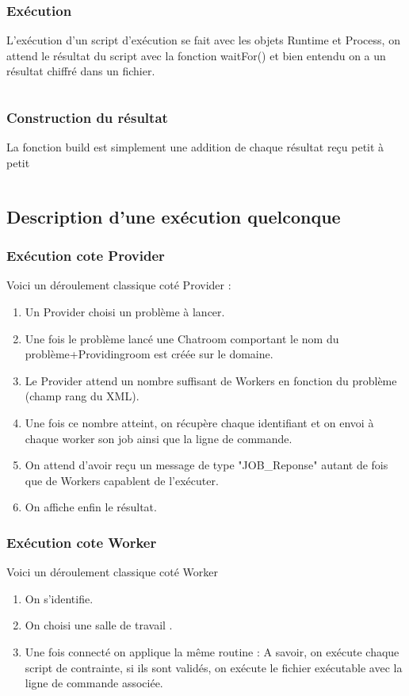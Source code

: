 \documentclass[11pt]{article}
\begin{document}
\subsubsection{Exécution} 
L\textquoteright exécution d'un script d'exécution se fait avec les objets Runtime et Process, on attend le résultat du script avec la fonction waitFor() et bien entendu on a un résultat chiffré dans un fichier. 
\inputminted[tabsize=2,frame=lines,linenos]{Perl}{Fichier_import/calcul.pl}
\newpage
\subsubsection{Construction du résultat} 
La fonction build est simplement une addition de chaque résultat reçu petit à petit 
\inputminted[tabsize=2,frame=lines,linenos]{java}{Fichier_import/build.java}
\newpage
\subsection{Description d'une exécution quelconque} 
\subsubsection{Exécution cote Provider}
Voici un déroulement classique coté Provider :
\begin{enumerate}
\item Un Provider choisi un problème à lancer.
\item Une fois le problème lancé une Chatroom comportant le nom du problème+Providingroom est créée sur le domaine.
\item Le Provider attend un nombre suffisant de Workers en fonction du problème (champ rang du XML).
\item Une fois ce nombre atteint, on récupère chaque identifiant et on envoi à chaque worker son job ainsi que la ligne de commande.
\item On attend d'avoir reçu un message de type "JOB\_Reponse" autant de fois que de Workers capablent de l'exécuter. 
\item On affiche enfin le résultat. 
\end{enumerate}

\subsubsection{Exécution cote Worker}
Voici un déroulement classique coté Worker
\begin{enumerate}
\item On s'identifie.
\item On choisi une salle de travail .
\item Une fois connecté on applique la même routine 
: A savoir, on exécute chaque script de contrainte, si ils sont validés, on exécute le fichier exécutable avec la ligne de commande associée.
\end{enumerate}
\end{document}
